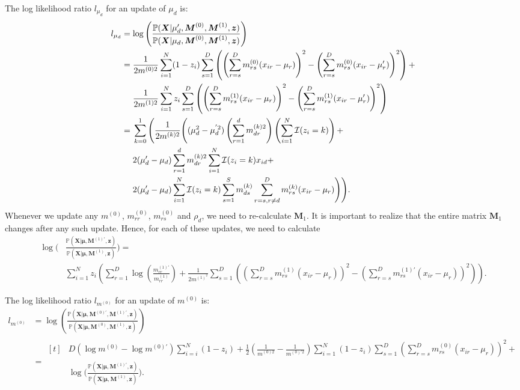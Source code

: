 \documentclass[a4paper,11pt]{article}
\def\M{\boldsymbol{M}}
\def\X{\boldsymbol{X}}
\def\bmu{\boldsymbol{\mu}}
\def\p{\mathbb{P}}
\def\mrr{m_{rr}}
\def\mrs{m_{rs}}
\begin{document}
The log likelihood ratio $l_{\mu_d}$ for an update of $\mu_d$ is:
\begin{align*}
l_{\mu_d} &= \log \left( \frac{\p(\X | \mu_d', \M^{(0)}, \M^{(1)}, \boldsymbol z )}{\p(\X | \mu_d, \M^{(0)}, \M^{(1)}, \boldsymbol z )} \right) \\
&= \begin{aligned}[t]
& \frac{1}{2m^{(0)2}}\sum_{i=1}^N (1- z_i) \sum_{s = 1}^{D}\left( \left(\sum_{r = s}^{D}m_{rs}^{(0)} (x_{ir} - \mu_r) \right)^2- \left(\sum_{r = s}^{D}m_{rs}^{(0)} (x_{ir} - \mu_r') \right)^2 \right) + \\
& \frac{1}{2m^{(1)2}}\sum_{i=1}^N z_i \sum_{s = 1}^{D}\left( \left(\sum_{r = s}^{D}m_{rs}^{(1)} (x_{ir} - \mu_r) \right)^2- \left(\sum_{r = s}^{D}m_{rs}^{(1)} (x_{ir} - \mu_r') \right)^2 \right)
\end{aligned}\\
&= \begin{aligned}[t]
& \sum_{k=0}^1 \Bigg( \frac{1}{2m^{(k)2}}\Bigg((\mu_d^{2} - \mu_d^{'2}) \left( \sum_{r=1}^{d} m_{dr}^{(k)2} \right) \left(\sum_{i=1}^N {\cal I}(z_i=k) \right) + \\
& 2(\mu_d' -\mu_d) \sum_{r=1}^d m_{dr}^{(k)2} \sum_{i=1}^N {\cal I}(z_i=k) x_{id} + \\
&   2(\mu_d' -\mu_d) \sum_{i=1}^N {\cal I}(z_i=k) \sum_{s=1}^{S} m_{ds}^{(k)} \sum_{r=s, r \neq d}^{D} m_{rs}^{(k)}(x_{ir} - \mu_r) \Bigg) \Bigg).
 \end{aligned}
\end{align*}
Whenever we update any $m^{(0)}$, $\mrr^{(0)}$, $\mrs^{(0)}$ and $\rho_d$, we need to re-calculate $\M_1$. It is important to realize that the entire matrix $\M_1$ changes after any such update. Hence, for each of these updates, we need to calculate
\begin{align*}
\log \Bigg( & \frac{\p(\X | \bmu, \M^{(1)'}, \boldsymbol z)}{\p(\X | \bmu, \M^{(1)}, \boldsymbol z)} \Bigg) = \\
 & \sum_{i=1}^N z_i \left(\sum_{r=1}^D \log \left( \frac{m_{rr}^{(1)'}}{m_{rr}^{(1)}} \right) + \frac{1}{2m^{(1)^2}} \sum_{s=1}^D
\left(\left(\sum_{r=s}^D m_{rs}^{(1)} (x_{ir} - \mu_r) \right)^2 - \left(\sum_{r=s}^D m_{rs}^{(1)'} (x_{ir} - \mu_r ) \right)^2 \right)\right).
\end{align*}

The log likelihood ratio $l_{m^{(0)}}$ for an update of $m^{(0)}$ is:
\begin{align*}
l_{m^{(0)}} &= \log \left( \frac{\p(\X | \bmu, \M^{(0)'}, \M^{(1)'}, \boldsymbol z )}{\p(\X | \bmu, \M^{(0)}, \M^{(1)}, \boldsymbol z )} \right) \\
 &= \begin{aligned}[t]
    & D(\log m^{(0)} - \log m^{(0)'}) \sum_{i=i}^N (1-z_i)  + \frac{1}{2}\left(\frac{1}{m^{(0)2}} - \frac{1}{m^{(0)'2}} \right) \sum_{i=1}^N (1-z_i) \sum_{s = 1}^{D} \left(\sum_{r = s}^{D}m_{rs}^{(0)} (x_{ir} - \mu_r) \right)^2 + \\
    & \log \Bigg( \frac{\p(\X | \bmu, \M^{(1)'}, \boldsymbol z)}{\p(\X | \bmu, \M^{(1)}, \boldsymbol z)} \Bigg).
\end{aligned}
\end{align*}
\end{document}
